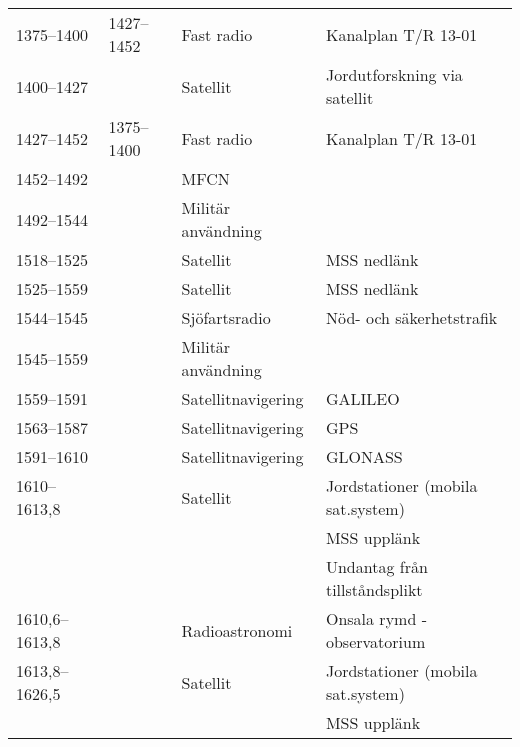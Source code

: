 \documentclass[10pt,swedish,a4paper,twoside]{article}
\begin{document}
\begin{landscape}
\begin{longtable}{llll}
	1375--1400         & 1427--1452         & Fast radio              & Kanalplan T/R 13-01                      \\
	1400--1427         &                    & Satellit                & Jordutforskning via satellit             \\
	1427--1452         & 1375--1400         & Fast radio              & Kanalplan T/R 13-01                      \\
	1452--1492         &                    & MFCN                    &  \\
	1492--1544         &                    & Militär användning      &  \\
	1518--1525         &                    & Satellit                & MSS nedlänk                              \\
	1525--1559         &                    & Satellit                & MSS nedlänk                              \\
	1544--1545         &                    & Sjöfartsradio           & Nöd- och säkerhetstrafik                 \\
	1545--1559         &                    & Militär användning      &  \\
	1559--1591         &                    & Satellitnavigering      & GALILEO                                  \\
	1563--1587         &                    & Satellitnavigering      & GPS                                      \\
	1591--1610         &                    & Satellitnavigering      & GLONASS                                  \\
	1610--1613,8       &                    & Satellit                & Jordstationer (mobila sat.system)        \\
	                   &                    &                         & MSS upplänk                              \\
	                   &                    &                         & Undantag från tillståndsplikt            \\
	1610,6--1613,8     &                    & Radioastronomi          & Onsala rymd - observatorium              \\
	1613,8--1626,5     &                    & Satellit                & Jordstationer (mobila sat.system)        \\
	                   &                    &                         & MSS upplänk                              \\

\end{longtable}
\end{landscape}
\end{document}
